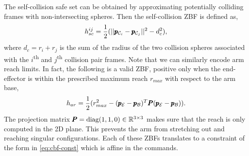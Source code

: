 The self-collision safe set can be obtained by approximating potentially colliding frames with non-intersecting spheres. Then the self-collision ZBF is defined as,
\begin{equation}
    h_{sc}^{ij} = \frac{1}{2}(||\pmb{p}_{\mathcal{C}_i} - \pmb{p}_{\mathcal{C}_j}||^2 - d_c^2),
\end{equation}
where $d_c = r_i + r_j$ is the sum of the radius of the two collision spheres associated with the $i$\textsuperscript{th}  and $j$\textsuperscript{th} collision pair frames. Note that we can similarly encode arm reach limits. In fact, the following is a valid ZBF, positive only when the end-effector is within the prescribed maximum reach $r_{max}$ with respect to the arm base,
\begin{equation}
    h_{ar} = \frac{1}{2}(r_{max}^2 - (\pmb{p}_{\mathcal{E}} - \pmb{p}_{\mathcal{B}})^T \pmb{P} (\pmb{p}_{\mathcal{E}} - \pmb{p}_{\mathcal{B}}) ).
\end{equation}
The projection matrix $\pmb{P} = \text{diag}(1, 1, 0) \in \mathbb{R}^{3 \times 3}$ makes sure that the reach is only computed in the 2D plane. This prevents the arm from stretching out and reaching singular configurations. Each of these ZBFs translates to a constraint of the form in \eqref{eq:cbf-const} which is affine in the commands. 

